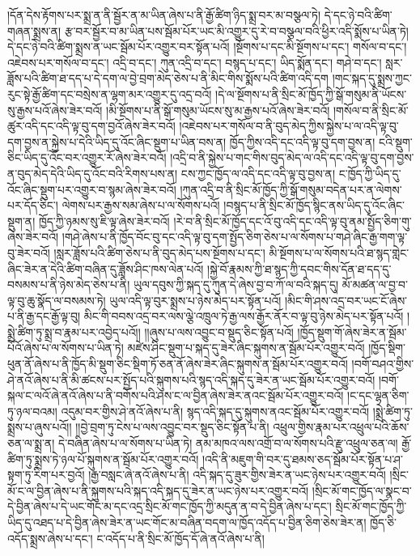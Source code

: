 །དོན་དེས་རྟོགས་པར་སྨྲ་ན་ནི་སྦྱོར་ན་མ་ཡིན་ཞེས་པ་ནི་རྒྱོ་ཚིག་ཉིད་སྨྲ་བར་མ་བསྩལ་ཏེ། དེ་དང་ཉེ་བའི་ཚིག་གཞན་སྨྲས་ན། རྩ་བར་སྦྱོར་བ་མ་ཡིན་པས་སྦོམ་པོར་ཡང་མི་འགྱུར་དུ་རེ་བ་བསྩལ་བའི་ཕྱིར་འདི་སྨོས་པ་ཡིན་ཏེ། དེ་དང་ཉེ་བའི་ཚིག་སྨྲས་ན་ཡང་སྦོམ་པོར་འགྱུར་བར་སྟོན་པའོ། །སྔོགས་པ་དང་མི་སྔོགས་པ་དང་། གསོལ་བ་དང་། འཇེབས་པར་གསོལ་བ་དང་། འདྲི་བ་དང་། ཀུན་འདྲི་བ་དང་། བསྙད་པ་དང་། ཡིད་སྨོན་དང་། གཤེ་བ་དང་། སླར་ཟློས་པའི་ཚིག་ཐ་དད་པ་དེ་དག་ལ་བྱེ་བྲག་མེད་ཅེས་པ་ནི་མིང་གིས་སྨོས་པའི་ཚིག་འདི་དག །གང་སྐད་དུ་སྨྲས་ཀྱང་རུང་སྟེ་རྒྱོ་ཚིག་དང་བསྲེས་ན་ལྷག་མར་འགྱུར་དུ་འདྲ་བའོ། །དེ་ལ་སྔོགས་པ་ནི་སྲིང་མོ་ཁྱོད་ཀྱི་སྒོ་གསུམ་ནི་ཡོངས་སུ་རྒྱས་པའོ་ཞེས་ཟེར་བའོ། །མི་སྔོགས་པ་ནི་སྒོ་གསུམ་ཡོངས་སུ་མ་རྒྱས་པའོ་ཞེས་ཟེར་བའོ། །གསོལ་བ་ནི་སྲིང་མོ་ཚུར་འདི་དང་འདི་ལྟ་བུ་དག་བྱའོ་ཞེས་ཟེར་བའོ། །འཇེབས་པར་གསོལ་བ་ནི་བུད་མེད་ཀྱིས་སྐྱེས་པ་ལ་འདི་ལྟ་བུ་དག་བྱས་ན་སྐྱེས་པ་དེའི་ཡིད་དུ་འོང་ཞིང་སྡུག་པ་ཡིན་བས་ན། ཁྱོད་ཀྱིས་འདི་དང་འདི་ལྟ་བུ་དག་བྱས་ན། ངའི་སྡུག་ཅིང་ཡིད་དུ་འོང་བར་འགྱུར་རོ་ཞེས་ཟེར་བའོ། །འདྲི་བ་ནི་སྐྱེས་པ་གང་གིས་བུད་མེད་ལ་འདི་དང་འདི་ལྟ་བུ་དག་བྱས་ན་བུད་མེད་དེའི་ཡིད་དུ་འོང་བའི་རིགས་པས་ན། ངས་ཀྱང་ཁྱོད་ལ་འདི་དང་འདི་ལྟ་བུ་བྱས་ན། ང་ཁྱོད་ཀྱི་ཡིད་དུ་འོང་ཞིང་སྡུག་པར་འགྱུར་བ་སྙམ་ཞེས་ཟེར་བའོ། །ཀུན་འདྲི་བ་ནི་སྲིང་མོ་ཁྱོད་ཀྱི་སྒོ་གསུམ་བདེན་པར་ན་ལེགས་པར་དོད་ཅིང་། ལེགས་པར་རྒྱས་སམ་ཞེས་པ་ལ་སོགས་པའོ། །བསྙད་པ་ནི་སྲིང་མོ་ཁྱོད་སྙིང་ནས་ཡིད་དུ་འོང་ཞིང་སྡུག་ན། ཁྱོད་ཀྱི་ཉམས་སུ་ཇི་ལྟ་ཞེས་ཟེར་བའོ། །རེ་བ་ནི་སྲིང་མོ་ཁྱོད་དང་འོ་བུ་འདི་དང་འདི་ལྟ་བུ་ནམ་སྤྱོད་ཅིག་གུ་ཞེས་ཟེར་བའོ། །གཤེ་ཞེས་པ་ནི་ཁྱོད་བོང་བུ་དང་འདི་ལྟ་བུ་དག་སྤྱོད་ཅིག་ཅེས་པ་ལ་སོགས་པ་གཤེ་ཞིང་རྒྱ་གག་ལྟ་བུ་ཟེར་བའོ། །སླར་ཟློས་པའི་ཚིག་ཅེས་པ་ནི་བུད་མེད་པས་སྔོགས་པ་དང་། མི་སྔོགས་པ་ལ་སོགས་པའི་ཐ་སྙད་གླེང་ཞིང་ཟེར་ན་དེའི་ཚིག་བཞིན་དུ་ཟློས་ཤིང་ཁས་ལེན་པའོ། །སྐྱེ་བོ་རྣམས་ཀྱི་ཐ་སྙད་ཀྱི་དབང་གིས་དོན་ཐ་དད་དུ་བསམས་པ་ནི་ཉེས་མེད་ཅེས་པ་ནི། ཡུལ་དབུས་ཀྱི་སྐད་དུ་ཀུན་དེ་ཞེས་བྱ་བ་ཀོ་ལ་བའི་སྐད་དུ། མོ་མཚན་ལ་བྱ་བ་ལྟ་བུ་ཆུ་སྣོད་ལ་བསམས་ཏེ། ཡུལ་འདི་ལྟ་བུར་སྨྲས་པ་ཉེས་མེད་པར་སྟོན་པའོ། །མིང་གི་ཤས་འདྲ་བར་ཡང་ངོ་ཞེས་པ་ནི་རྒྱ་དང་རྒྱོ་ལྟ་བུ། མིང་གི་བབས་འདྲ་བར་ལས་ལྕེ་འཁྲུལ་ཏེ་རྒྱ་ལས་རྒྱོར་ནོར་བ་ལྟ་བུ་ཉེས་མེད་པར་སྟོན་པའོ། །སྨྲེ་ཚིག་ཏུ་སྨྲ་བ་རྣམ་པར་འབྱེད་པའོ།། །།ཞུས་པ་ལས་འབྱུང་བ་སྡུད་ཅིང་སྟོན་པའོ། །ཁྱོད་སྡུག་གོ་ཞེས་ཟེར་ན་སྦོམ་པོའོ་ཞེས་པ་ལ་སོགས་པ་ཡིན་ཏེ། མཛེས་ཤིང་སྡུག་པ་སྐད་དུ་ཟེར་ཞིང་སྐུགས་ན་སྦོམ་པོར་འགྱུར་བའོ། །ཁྱོད་སྡིག་ཕུན་ནོ་ཞེས་པ་ནི་ཁྱོད་མི་སྡུག་ཅིང་སྡིག་ཏོ་ཅན་ནོ་ཞེས་ཟེར་ཞིང་སྐུགས་ན་སྦོམ་པོར་འགྱུར་བའོ། །བགོ་བཤའ་གྱིས་ཤེ་ནའོ་ཞེས་པ་ནི་མི་ཚངས་པར་སྤྱོད་པའི་སྐུགས་པའི་སྙད་འདི་སྐད་དུ་ཟེར་ན་ཡང་སྦོམ་པོར་འགྱུར་བའོ། །བགོ་སྐལ་ང་ལའོ་ཞེ་ནའོ་ཞེས་པ་ནི་བགོས་པའི་ཤས་ང་ལ་བྱིན་ཞེས་ཟེར་ནའང་སྦོམ་པོར་འགྱུར་བའོ། །ང་དང་ལྷན་ཅིག་ཏུ་ཉལ་བའམ། འདུམ་བར་གྱིས་ཤེ་ནའོ་ཞེས་པ་ནི། སྙད་འདི་སྐད་དུ་སྐུགས་ནའང་སྦོམ་པོར་འགྱུར་བའོ། །སྨྲེ་ཚིག་ཏུ་སྨྲས་པ་ཞུས་པའོ།། །།བྱེ་བྲག་ཏུ་ངེས་པ་ལས་འབྱུང་བར་སྡུད་ཅིང་སྟོན་པ་ནི། འཕྲུལ་གྱིས་རྣམ་པར་འཕྲུལ་པའི་ཆོས་ཅན་ལ་སྨྲ་ན། དེ་བཞིན་ཞེས་པ་ལ་སོགས་པ་ཡིན་ཏེ། ནམ་མཁའ་ལས་འགྲོ་བ་ལ་སོགས་པའི་རྫུ་འཕྲུལ་ཅན་ལ། རྒྱོ་ཚིག་ཏུ་སྨྲས་ཏེ་ཉལ་པོ་སྐུགས་ན་སྦོམ་པོར་འགྱུར་བའོ། །འདི་ནི་མཇུག་གི་བར་དུ་ཐམས་ཅད་སྦོམ་པོར་སྟོན་པ་ཤ་སྟག་ཏུ་རིག་པར་བྱའོ། །རྒྱ་བསླང་ཞེ་ནའོ་ཞེས་པ་ནི། འདི་སྐད་དུ་ཟུར་གྱིས་ཟེར་ན་ཡང་ཉེས་པར་འགྱུར་བའོ། །སྲིང་མོ་ང་ལ་བྱིན་ཞེས་པ་ནི་སྐུགས་པའི་སྐད་འདི་སྐད་དུ་ཟེར་ན་ཡང་ཉེས་པར་འགྱུར་བའོ། །སྲིང་མོ་གང་ཁྱོད་ལ་སྣང་བ་དེ་བྱིན་ཞེས་པ་དེ་ཡང་གོང་མ་དང་འདྲ་སྲིང་མོ་གང་ཁྱོད་ཀྱི་མདུན་ན་བ་དེ་བྱིན་ཞེས་པ་དང་། སྲིང་མོ་གང་ཁྱོད་ཀྱི་ཡིད་དུ་འཐད་པ་དེ་བྱིན་ཞེས་ཟེར་ན་ཡང་གོང་མ་བཞིན་བདག་ལ་ཁྱོད་འདོད་པ་བྱིན་ཅིག་ཅེས་ཟེར་ན། ཁྱོད་ཅི་འདོད་སྨྲས་ཞེས་པ་དང་། ང་འདོད་པ་ནི་སྲིང་མོ་ཁྱོད་དོ་ཞེ་ནའོ་ཞེས་པ་ནི། 